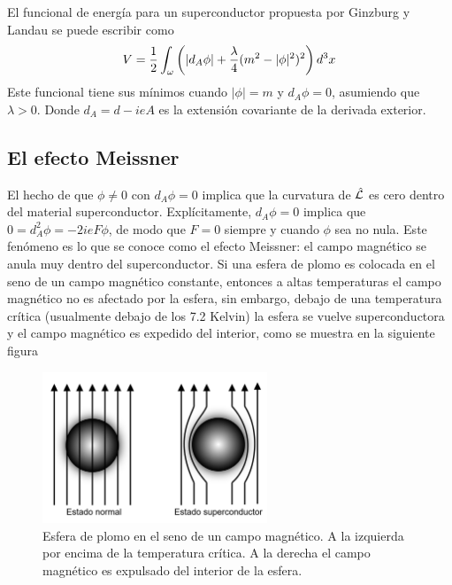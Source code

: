 El funcional de energía para un superconductor propuesta por Ginzburg y Landau se puede escribir como
\begin{align}
  V = \frac{1}{2}\int_\omega\left(|d_A \phi|+\frac{\lambda}{4}(m^2-|\phi|^2)^2\right)d^3x \label{eq:1} 
\end{align}
Este funcional tiene sus mínimos cuando $|\phi|=m$ y $d_A\phi=0$, asumiendo que $\lambda>0$. Donde $d_A=d-ieA$ es la extensión covariante de la derivada exterior.

\subsection{El efecto Meissner}

El hecho de que $\phi\neq 0$ con $d_A\phi=0$ implica que la curvatura de $\hat{\mathcal{L}}$ es cero dentro del material superconductor. Explícitamente, $d_A\phi=0$ implica que $0=d_A^2\phi=-2ieF\phi$, de modo que $F=0$ siempre y cuando $\phi$ sea no nula. Este fenómeno es lo que se conoce como el efecto Meissner: el campo magnético se anula muy dentro del superconductor. Si una esfera de plomo es colocada en el seno de un campo magnético constante, entonces a altas temperaturas el campo magnético no es afectado por la esfera, sin embargo, debajo de una temperatura crítica (usualmente debajo de los 7.2 Kelvin) la esfera se vuelve superconductora y el campo magnético es expedido del interior, como se muestra en la siguiente figura

\begin{figure}[ht]
	\centering
	\includegraphics[width=0.6\textwidth]{gfx/superconductingsphere.png}
	\caption{Esfera de plomo en el seno de un campo magnético. A la izquierda por encima de la temperatura crítica. A la derecha el campo magnético es expulsado del interior de la esfera.}
	\label{fig:1}
\end{figure}

